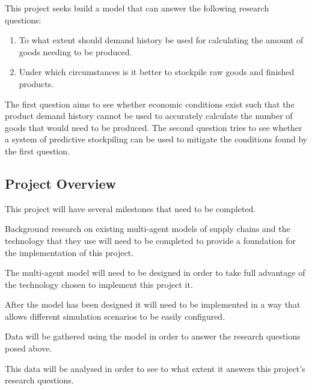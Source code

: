 This project seeks build a model that can answer the following research questions:

\begin{enumerate}
    \item To what extent should demand history be used for calculating the amount of goods needing to be produced.
    \item Under which circumstances is it better to stockpile raw goods and finished products.
\end{enumerate}

The first question aims to see whether economic conditions exist such that the product demand history cannot be used to accurately calculate the number of goods that would need to be produced.
The second question tries to see whether a system of predictive stockpiling can be used to mitigate the conditions found by the first question.

\subsection{Project Overview}

This project will have several milestones that need to be completed.

\begin{description}[style=nextline]
    \item [Literature Review] Background research on existing multi-agent models of supply chains and the technology that they use will need to be completed to provide a foundation for the implementation of this project.
    \item [Model Design] The multi-agent model will need to be designed in order to take full advantage of the technology chosen to implement this project it.
    \item [Model Implementation] After the model has been designed it will need to be implemented in a way that allows different simulation scenarios to be easily configured.
    \item [Data Gathering] Data will be gathered using the model in order to answer the research questions posed above.
    \item [Analysis] This data will be analysed in order to see to what extent it answers this project's research questions.
\end{description}
